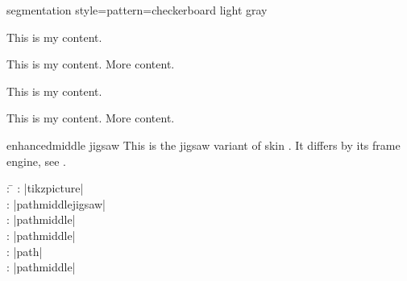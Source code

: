 \begin{dispExample*}{segmentation style={pattern=checkerboard light gray}}
\begin{tcbraster}[skin=enhancedfirst jigsaw,raster equal height,raster columns=4,
    colback=LightGreen,colframe=DarkGreen,colbacktitle=LimeGreen!75!DarkGreen,
    opacityframe=0.5,opacityback=0.5,opacitybacktitle=0.5,
    left=1mm,right=1mm,top=1mm,bottom=1mm,middle=1mm]
  \begin{tcolorbox}
    This is my content.
  \end{tcolorbox}
  \begin{tcolorbox}
    This is my content.
    \tcblower
    More content.
  \end{tcolorbox}
  \begin{tcolorbox}[adjusted title=My title]
    This is my content.
  \end{tcolorbox}
  \begin{tcolorbox}[adjusted title=My title]
    This is my content.
    \tcblower
    More content.
  \end{tcolorbox}
\end{tcbraster}
\end{dispExample*}


\clearpage
\begin{docSkin}{enhancedmiddle jigsaw}
  This is the jigsaw variant of skin .
  It differs by its frame engine, see .
\begin{tcolorbox}[skintable=enhancedmiddle jigsaw]
  \begin{tabbing}
    : \=\kill
    :  \> |tikzpicture|\\ 
    :           \> |pathmiddlejigsaw|\\
    : \> |pathmiddle|\\ 
    :        \> |pathmiddle|\\
    :    \> |path|\\
    :           \> |pathmiddle|
  \end{tabbing}
\end{tcolorbox}
\end{docSkin}



